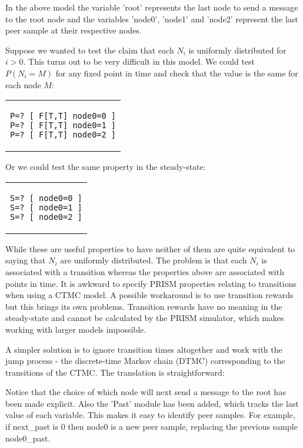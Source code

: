 \documentclass[a4paper,10pt]{article}
\newcommand{\code}[1]{
  \footnotesize
  
}
\newcommand{\prismmodel}[1]{
  \begin{quotation}
  \code{../models/#1.sm}
  \end{quotation}
}
\newenvironment{prismprop}[0]{
  \begin{center}
  \begin{tabular}{c}
  \footnotesize
}{
  \end{tabular}
  \end{center}
}
\begin{document}
In the above model the variable 'root' represents the last node to send a message to the root node and the variables 'node0', 'node1' and 'node2' represent the last peer sample at their respective nodes.

Suppose we wanted to test the claim that each $N_i$ is uniformly distributed for $i>0$. This turns out to be very difficult in this model. We could test $P(N_i = M)$ for any fixed point in time and check that the value is the same for each node $M$:

\begin{prismprop}
\begin{lstlisting}
P=? [ F[T,T] node0=0 ]
P=? [ F[T,T] node0=1 ]
P=? [ F[T,T] node0=2 ]
\end{lstlisting}
\end{prismprop}

Or we could test the same property in the steady-state:

\begin{prismprop}
\begin{lstlisting}
S=? [ node0=0 ]
S=? [ node0=1 ]
S=? [ node0=2 ]
\end{lstlisting}
\end{prismprop}

While these are useful properties to have neither of them are quite equivalent to saying that $N_i$ are uniformly distributed. The problem is that each $N_i$ is associated with a transition whereas the properties above are associated with points in time. It is awkward to specify PRISM properties relating to transitions when using a CTMC model. A possible workaround is to use transition rewards but this brings its own problems. Transition rewards have no meaning in the steady-state and cannot be calculated by the PRISM simulator, which makes working with larger models impossible.

A simpler solution is to ignore transition times altogether and work with the jump process - the discrete-time Markov chain (DTMC) corresponding to the transitions of the CTMC. The translation is straightforward:

\prismmodel{dtmc_single}

Notice that the choice of which node will next send a message to the root has been made explicit. Also the 'Past' module has been added, which tracks the last value of each variable. This makes it easy to identify peer samples. For example, if next\_past is 0 then node0 is a new peer sample, replacing the previous sample node0\_past.
\end{document}
